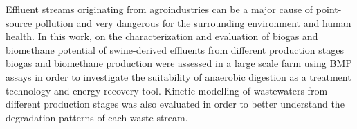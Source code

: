 Effluent streams originating from agroindustries can be a major cause of point-source pollution and very dangerous for the surrounding environment and human health. In this work, on the characterization and evaluation of biogas and biomethane potential of swine-derived effluents from different production stages biogas and biomethane production were assessed in a large scale farm using BMP assays in order to investigate the suitability of anaerobic digestion as a treatment technology and energy recovery tool. Kinetic modelling of wastewaters from different production stages was also evaluated in order to better understand the degradation patterns of each waste stream.